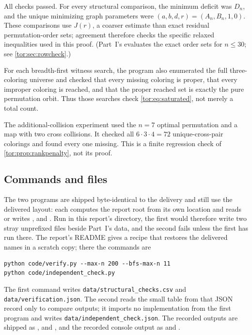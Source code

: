 \documentclass[11pt,a4paper]{article}
\numberwithin{equation}{section}
\theoremstyle{definition}
\theoremstyle{remark}
\begin{document}
All checks passed. For every structural comparison, the minimum deficit was
$D_n$, and the unique minimizing graph parameters were
$(a,b,d,r)=(A_n,B_n,1,0)$. These comparisons use $J(r)$, a coarser estimate
than exact residual permutation-order sets; agreement therefore checks the
specific relaxed inequalities used in this proof. (Part~I's
 evaluates the exact order sets for
$n\le30$; see \cref{tor:sec:rowcheck}.)

For each breadth-first witness search, the program also enumerated the full
three-coloring universe and checked that every missing coloring is proper,
that every improper coloring is reached, and that the proper reached set is
exactly the pure permutation orbit. Thus those searches check
\eqref{tor:eq:saturated}, not merely a total count.

The additional-collision experiment used the $n=7$ optimal permutation and a
map with two cross collisions. It checked all $6\cdot3\cdot4=72$
unique-cross-pair colorings and found every one missing. This is a finite
regression check of \cref{tor:prop:rankpenalty}, not its proof.

\subsection{Commands and files}

The two programs are shipped byte-identical to the delivery and still use the
delivered layout: each computes the report root from its own location and
reads or writes ,
 and .
Run in this report's directory, the first would therefore write two stray
unprefixed files beside Part~I's data, and the second fails unless the first
has run there. The report's README gives a recipe that restores the delivered
names in a scratch copy; there the commands are
\begin{lstlisting}
python code/verify.py --max-n 200 --bfs-max-n 11
python code/independent_check.py
\end{lstlisting}
The first command writes \texttt{data/structural\_checks.csv} and
\texttt{data/verification.json}. The second reads the small table from that
JSON record only to compare outputs; it imports no implementation from the
first program and writes \texttt{data/independent\_check.json}. The recorded
outputs are shipped as ,
 and
, and the recorded console
output as  and
.
\end{document}
